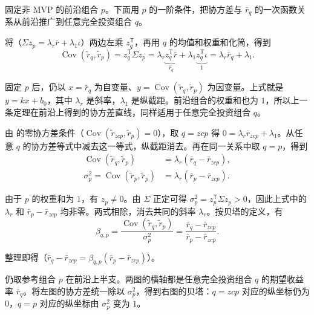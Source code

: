 \begin{solution}[label-content={证明},blank-type=none]
固定非 MVP 的前沿组合 $p$。下面用 $p$ 的一阶条件，把协方差与 $\bar r_q$ 的一次函数关系从前沿推广到任意完全投资组合 $q$。

将（$\Sigma z_p=\lambda_r\bar r+\lambda_1\iota$）两边左乘 $z_q^{\mathsf T}$，再用 $q$ 的均值和权重和化简，得到
\[
 \operatorname{Cov}(\widetilde r_q,\widetilde r_p)
 =z_q^{\mathsf T}\Sigma z_p
 =\lambda_r\underbrace{z_q^{\mathsf T}\bar r}_{\bar r_q}
  +\lambda_1\underbrace{z_q^{\mathsf T}\iota}_{1}
 =\lambda_r\bar r_q+\lambda_1.
\]

固定 $p$ 后，仍以 $x=\bar r_q$ 为自变量、$y=\operatorname{Cov}(\widetilde r_q,\widetilde r_p)$ 为因变量。上式就是 $y=kx+b_0$，其中 $\lambda_r$ 是斜率，$\lambda_1$ 是纵截距。前沿组合的权重和也为 $1$，所以上一条定理在前沿上得到的协方差直线，同样适用于任意完全投资组合 $q$。

由 的零协方差条件（$\operatorname{Cov}(\widetilde r_{zcp},\widetilde r_p)=0$），取 $q=zcp$ 得 $0=\lambda_r\bar r_{zcp}+\lambda_1$。从任意 $q$ 的协方差等式中减去这一等式，纵截距消去。再在同一关系中取 $q=p$，得到
\[
 \begin{aligned}
 \operatorname{Cov}(\widetilde r_q,\widetilde r_p)
 &=\lambda_r(\bar r_q-\bar r_{zcp}),\\
 \sigma_p^2=\operatorname{Cov}(\widetilde r_p,\widetilde r_p)
 &=\lambda_r(\bar r_p-\bar r_{zcp}).
 \end{aligned}
\]

由于 $p$ 的权重和为 $1$，有 $z_p\ne0$。由 $\Sigma$ 正定可得 $\sigma_p^2=z_p^{\mathsf T}\Sigma z_p>0$，因此上式中的 $\lambda_r$ 和 $\bar r_p-\bar r_{zcp}$ 均非零。两式相除，消去共同的斜率 $\lambda_r$。按贝塔的定义，有
\[
 \beta_{q,p}
 =\frac{\operatorname{Cov}(\widetilde r_q,\widetilde r_p)}{\sigma_p^2}
 =\frac{\bar r_q-\bar r_{zcp}}{\bar r_p-\bar r_{zcp}}.
\]

整理即得（$\bar r_q-\bar r_{zcp}=\beta_{q,p}(\bar r_p-\bar r_{zcp})$）。
\end{solution}

 仍取参考组合 $p$ 在前沿上半支。两图的横轴都是任意完全投资组合 $q$ 的期望收益率 $\bar r_q$。将左图的协方差统一除以 $\sigma_p^2$，得到右图的贝塔：$q=zcp$ 对应的纵坐标仍为 $0$，$q=p$ 对应的纵坐标由 $\sigma_p^2$ 变为 $1$。

\begin{center}
\begin{minipage}{\linewidth}
\centering
\renewcommand{\thewjFigure}{\thechapter.S\arabic{wjFigure}}%
%
\par
{}
\end{minipage}
\end{center}

